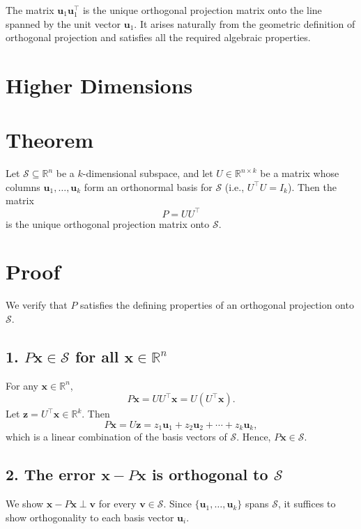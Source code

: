 \documentclass{article}
\begin{document}
The matrix $ \mathbf{u}_1 \mathbf{u}_1^\top $ is the unique orthogonal projection matrix onto the line spanned by the unit vector $ \mathbf{u}_1 $. It arises naturally from the geometric definition of orthogonal projection and satisfies all the required algebraic properties.

\section{Higher Dimensions}

\section*{Theorem}
Let $ \mathcal{S} \subseteq \mathbb{R}^n $ be a $ k $-dimensional subspace, and let $ U \in \mathbb{R}^{n \times k} $ be a matrix whose columns $ \mathbf{u}_1, \dots, \mathbf{u}_k $ form an orthonormal basis for $ \mathcal{S} $ (i.e., $ U^\top U = I_k $).  
Then the matrix
\[
P = U U^\top
\]
is the unique orthogonal projection matrix onto $ \mathcal{S} $.

\section*{Proof}

We verify that $ P $ satisfies the defining properties of an orthogonal projection onto $ \mathcal{S} $.

\subsection*{1. $ P\mathbf{x} \in \mathcal{S} $ for all $ \mathbf{x} \in \mathbb{R}^n $}

For any $ \mathbf{x} \in \mathbb{R}^n $,
\[
P\mathbf{x} = U U^\top \mathbf{x} = U (U^\top \mathbf{x}).
\]
Let $ \mathbf{z} = U^\top \mathbf{x} \in \mathbb{R}^k $. Then
\[
P\mathbf{x} = U \mathbf{z} = z_1 \mathbf{u}_1 + z_2 \mathbf{u}_2 + \cdots + z_k \mathbf{u}_k,
\]
which is a linear combination of the basis vectors of $ \mathcal{S} $. Hence, $ P\mathbf{x} \in \mathcal{S} $.

\subsection*{2. The error $ \mathbf{x} - P\mathbf{x} $ is orthogonal to $ \mathcal{S} $}

We show $ \mathbf{x} - P\mathbf{x} \perp \mathbf{v} $ for every $ \mathbf{v} \in \mathcal{S} $.  
Since $ \{\mathbf{u}_1, \dots, \mathbf{u}_k\} $ spans $ \mathcal{S} $, it suffices to show orthogonality to each basis vector $ \mathbf{u}_i $.
\end{document}
